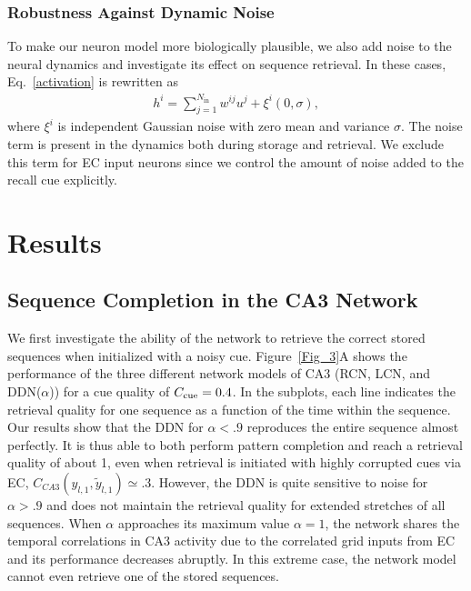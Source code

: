 \documentclass[utf8]{frontiersSCNS} %
\begin{document}
\subsubsection{Robustness Against Dynamic Noise}

To make our neuron model more biologically plausible, we also add noise to the neural dynamics and investigate its effect on sequence retrieval. In these cases, Eq.~\ref{activation} is rewritten as
\begin{align}
\label{dynamic-noise}
h^i = \sum_{j=1}^{N_\mathrm{in}} w^{ij}u^j + \xi ^i (0,\sigma),
\end{align}  
where $\xi^i$ is independent Gaussian noise with zero mean and variance $\sigma$. The noise term is present in the dynamics both during storage and retrieval. We exclude this term for EC input neurons since we control the amount of noise added to the recall cue explicitly.


\section{Results}
\subsection{Sequence Completion in the CA3 Network}

We first investigate the ability of the network to retrieve the correct stored sequences when initialized with a noisy cue. Figure~\ref{Fig_3}A shows the performance of the three different network models of CA3 (RCN, LCN, and DDN($\alpha$)) for a cue quality of $C_{\rm cue} = 0.4$. In the subplots, each line indicates the retrieval quality for one sequence as a function of the time within the sequence.
Our results show that the DDN for $\alpha < .9$ reproduces the entire sequence almost perfectly. It is thus able to both perform pattern completion and reach a retrieval quality of about 1, even when retrieval is initiated with highly corrupted cues via EC, $C_{CA3} (y_{l,1}, \tilde{y}_{l,1}) \simeq .3 $. 
However, the DDN is quite sensitive to noise for $\alpha > .9$ and does not maintain the retrieval quality for extended stretches of all sequences. When $\alpha$ approaches its maximum value $\alpha = 1$, the network shares the temporal correlations in CA3 activity due to the correlated grid inputs from EC and its performance decreases abruptly. In this extreme case, the network model cannot even retrieve one of the stored sequences.
% 
\end{document}
